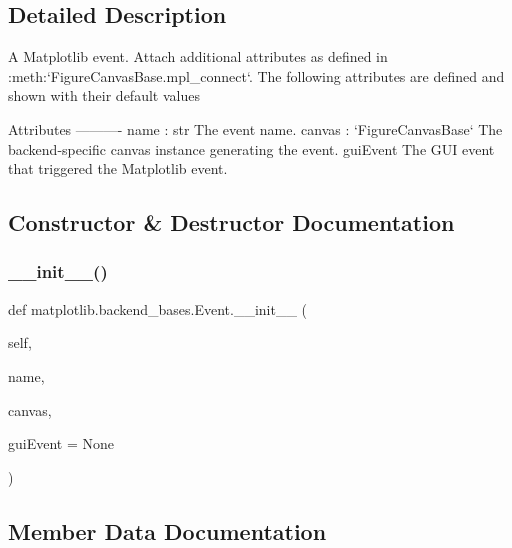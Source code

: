 \subsection{Detailed Description}
\begin{DoxyVerb}A Matplotlib event.  Attach additional attributes as defined in
:meth:`FigureCanvasBase.mpl_connect`.  The following attributes
are defined and shown with their default values

Attributes
----------
name : str
    The event name.
canvas : `FigureCanvasBase`
    The backend-specific canvas instance generating the event.
guiEvent
    The GUI event that triggered the Matplotlib event.
\end{DoxyVerb}
 

\subsection{Constructor \& Destructor Documentation}
\mbox{\label{classmatplotlib_1_1backend__bases_1_1Event_a39ec5c338f3c96435d8cc2aacd3d4be4}} 
\subsubsection{\texorpdfstring{\+\_\+\+\_\+init\+\_\+\+\_\+()}{\_\_init\_\_()}}
{\footnotesize\ttfamily def matplotlib.\+backend\+\_\+bases.\+Event.\+\_\+\+\_\+init\+\_\+\+\_\+ (\begin{DoxyParamCaption}\item[{}]{self,  }\item[{}]{name,  }\item[{}]{canvas,  }\item[{}]{gui\+Event = {\ttfamily None} }\end{DoxyParamCaption})}



\subsection{Member Data Documentation}
\mbox{\label{classmatplotlib_1_1backend__bases_1_1Event_a7721d867d81a1255b1aeb51babec4e14}} 

